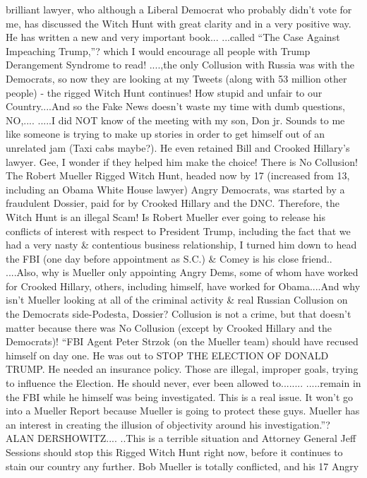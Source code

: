 brilliant lawyer, who although a Liberal Democrat who probably didn't
vote for me, has discussed the Witch Hunt with great clarity and in a
very positive way. He has written a new and very important book...
...called ``The Case Against Impeaching Trump,''? which I would
encourage all people with Trump Derangement Syndrome to read! ....,the
only Collusion with Russia was with the Democrats, so now they are
looking at my Tweets (along with 53 million other people) - the rigged
Witch Hunt continues! How stupid and unfair to our Country....And so the
Fake News doesn't waste my time with dumb questions, NO,.... .....I did
NOT know of the meeting with my son, Don jr. Sounds to me like someone
is trying to make up stories in order to get himself out of an unrelated
jam (Taxi cabs maybe?). He even retained Bill and Crooked Hillary's
lawyer. Gee, I wonder if they helped him make the choice! There is No
Collusion! The Robert Mueller Rigged Witch Hunt, headed now by 17
(increased from 13, including an Obama White House lawyer) Angry
Democrats, was started by a fraudulent Dossier, paid for by Crooked
Hillary and the DNC. Therefore, the Witch Hunt is an illegal Scam! Is
Robert Mueller ever going to release his conflicts of interest with
respect to President Trump, including the fact that we had a very nasty
\& contentious business relationship, I turned him down to head the FBI
(one day before appointment as S.C.) \& Comey is his close friend..
....Also, why is Mueller only appointing Angry Dems, some of whom have
worked for Crooked Hillary, others, including himself, have worked for
Obama....And why isn't Mueller looking at all of the criminal activity
\& real Russian Collusion on the Democrats side-Podesta, Dossier?
Collusion is not a crime, but that doesn't matter because there was No
Collusion (except by Crooked Hillary and the Democrats)! ``FBI Agent
Peter Strzok (on the Mueller team) should have recused himself on day
one. He was out to STOP THE ELECTION OF DONALD TRUMP. He needed an
insurance policy. Those are illegal, improper goals, trying to influence
the Election. He should never, ever been allowed to........ .....remain
in the FBI while he himself was being investigated. This is a real
issue. It won't go into a Mueller Report because Mueller is going to
protect these guys. Mueller has an interest in creating the illusion of
objectivity around his investigation.''? ALAN DERSHOWITZ.... ..This is a
terrible situation and Attorney General Jeff Sessions should stop this
Rigged Witch Hunt right now, before it continues to stain our country
any further. Bob Mueller is totally conflicted, and his 17 Angry
